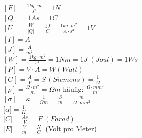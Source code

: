 \begin{minipage}{5cm}
	$\left[F\right] = \frac{1kg \cdot m}{s^2} = 1N$ \\
	$\left[Q\right] = 1 As = 1 C$ \\
	$\left[U\right] = \frac{\lbrack W \rbrack}{\lbrack Q \rbrack} =\frac{1 J}{C} = \frac{1kg \cdot m^2}{A \cdot s^3} = 1 V$ \\
	$\left[I\right] = A $ \\
	$\left[J\right] = \frac {A}{m^2} $\\
	$\left[W\right] = \frac{1kg \cdot m^2}{s^2} = 1Nm = 1 J \; (Joul) = 1 Ws$ \\
	$ \left[P\right] = V \cdot A = W (Watt)$\\
	$\left[G\right] = \frac{A}{V} = S \, (Siemens) = \frac{1}{\Omega}$\\
	$\left[ \rho \right] = \frac{\Omega \cdot m^2}{m} = \Omega m$  häufig:  $\frac{\Omega \cdot mm^2}{m} $\\
	$\left[ \sigma \right] = \kappa = \frac{1}{\Omega m} = \frac{S}{m} = \frac{m}{\Omega \cdot mm^2} $\\
	$\lbrack \alpha \rbrack = \frac{1}{K}$\\
	$\lbrack C \rbrack = \frac{As}{V} = F \; (Farad)$ \\ 
	$\lbrack E \rbrack = \frac{V}{m} = \frac{N}{C} \; $ (Volt pro Meter) \\ 
\end{minipage}

